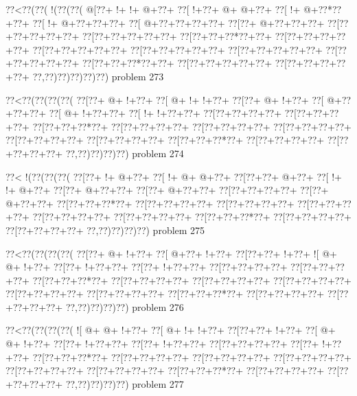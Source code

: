 \vbox{\vbox{\goo
\0??<\0??(\0??(\- !(\0??(\0??(
\- @[\0??+\- !+\- !+\- @+\0??+
\0??[\- !+\0??+\- @+\- @+\0??+
\0??[\- !+\- @+\0??*\0??+\0??+
\0??[\- !+\- @+\0??+\0??+\0??+
\0??[\- @+\0??+\0??+\0??+\0??+
\0??[\0??+\- @+\0??+\0??+\0??+
\0??[\0??+\0??+\0??+\0??+\0??+
\0??[\0??+\0??+\0??+\0??+\0??+
\0??[\0??+\0??+\0??*\0??+\0??+
\0??[\0??+\0??+\0??+\0??+\0??+
\0??[\0??+\0??+\0??+\0??+\0??+
\0??[\0??+\0??+\0??+\0??+\0??+
\0??[\0??+\0??+\0??+\0??+\0??+
\0??[\0??+\0??+\0??+\0??+\0??+
\0??[\0??+\0??+\0??*\0??+\0??+
\0??[\0??+\0??+\0??+\0??+\0??+
\0??[\0??+\0??+\0??+\0??+\0??+
\0??,\0??)\0??)\0??)\0??)\0??)
}
\hfil problem 273\hfil\break
}

\vbox{\vbox{\goo
\0??<\0??(\0??(\0??(\0??(
\0??[\0??+\- @+\- !+\0??+
\0??[\- @+\- !+\- !+\0??+
\0??[\0??+\- @+\- !+\0??+
\0??[\- @+\0??+\0??+\0??+
\0??[\- @+\- !+\0??+\0??+
\0??[\- !+\- !+\0??+\0??+
\0??[\0??+\0??+\0??+\0??+
\0??[\0??+\0??+\0??+\0??+
\0??[\0??+\0??+\0??*\0??+
\0??[\0??+\0??+\0??+\0??+
\0??[\0??+\0??+\0??+\0??+
\0??[\0??+\0??+\0??+\0??+
\0??[\0??+\0??+\0??+\0??+
\0??[\0??+\0??+\0??+\0??+
\0??[\0??+\0??+\0??*\0??+
\0??[\0??+\0??+\0??+\0??+
\0??[\0??+\0??+\0??+\0??+
\0??,\0??)\0??)\0??)\0??)
}
\hfil problem 274\hfil\break
}

\vbox{\vbox{\goo
\0??<\- !(\0??(\0??(\0??(
\0??[\0??+\- !+\- @+\0??+
\0??[\- !+\- @+\- @+\0??+
\0??[\0??+\0??+\- @+\0??+
\0??[\- !+\- !+\- @+\0??+
\0??[\0??+\- @+\0??+\0??+
\0??[\0??+\- @+\0??+\0??+
\0??[\0??+\0??+\0??+\0??+
\0??[\0??+\- @+\0??+\0??+
\0??[\0??+\0??+\0??*\0??+
\0??[\0??+\0??+\0??+\0??+
\0??[\0??+\0??+\0??+\0??+
\0??[\0??+\0??+\0??+\0??+
\0??[\0??+\0??+\0??+\0??+
\0??[\0??+\0??+\0??+\0??+
\0??[\0??+\0??+\0??*\0??+
\0??[\0??+\0??+\0??+\0??+
\0??[\0??+\0??+\0??+\0??+
\0??,\0??)\0??)\0??)\0??)
}
\hfil problem 275\hfil\break
}

\vbox{\vbox{\goo
\0??<\0??(\0??(\0??(\0??(
\0??[\0??+\- @+\- !+\0??+
\0??[\- @+\0??+\- !+\0??+
\0??[\0??+\0??+\- !+\0??+
\- ![\- @+\- @+\- !+\0??+
\0??[\0??+\- !+\0??+\0??+
\0??[\0??+\- !+\0??+\0??+
\0??[\0??+\0??+\0??+\0??+
\0??[\0??+\0??+\0??+\0??+
\0??[\0??+\0??+\0??*\0??+
\0??[\0??+\0??+\0??+\0??+
\0??[\0??+\0??+\0??+\0??+
\0??[\0??+\0??+\0??+\0??+
\0??[\0??+\0??+\0??+\0??+
\0??[\0??+\0??+\0??+\0??+
\0??[\0??+\0??+\0??*\0??+
\0??[\0??+\0??+\0??+\0??+
\0??[\0??+\0??+\0??+\0??+
\0??,\0??)\0??)\0??)\0??)
}
\hfil problem 276\hfil\break
}

\vbox{\vbox{\goo
\0??<\0??(\0??(\0??(\0??(
\- ![\- @+\- @+\- !+\0??+
\0??[\- @+\- !+\- !+\0??+
\0??[\0??+\0??+\- !+\0??+
\0??[\- @+\- @+\- !+\0??+
\0??[\0??+\- !+\0??+\0??+
\0??[\0??+\- !+\0??+\0??+
\0??[\0??+\0??+\0??+\0??+
\0??[\0??+\- !+\0??+\0??+
\0??[\0??+\0??+\0??*\0??+
\0??[\0??+\0??+\0??+\0??+
\0??[\0??+\0??+\0??+\0??+
\0??[\0??+\0??+\0??+\0??+
\0??[\0??+\0??+\0??+\0??+
\0??[\0??+\0??+\0??+\0??+
\0??[\0??+\0??+\0??*\0??+
\0??[\0??+\0??+\0??+\0??+
\0??[\0??+\0??+\0??+\0??+
\0??,\0??)\0??)\0??)\0??)
}
\hfil problem 277\hfil\break
}

